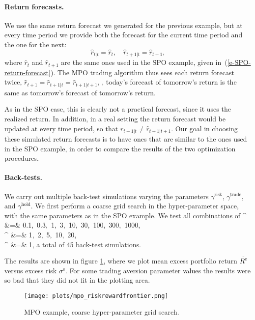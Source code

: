 \documentclass[openany]{now}
\newcommand{\Rep}{R^\mathrm{e}}
\begin{document}
\paragraph{Return forecasts.}
We use the same return forecast we generated for the previous example,
but at every time period we provide both the forecast for the current time period
and the one for the next:
\[
\hat r_{t|t} =  \hat r_t, \quad
\hat r_{t+1|t} =  \hat r_{t+1},
\]
where $\hat r_t$ and $\hat r_{t+1}$ are the same ones used in the
SPO example, given in~(\ref{e-SPO-return-forecast}).
The MPO trading algorithm thus sees each return forecast twice,
$\hat r_{t+1} = \hat r_{t+1|t} = \hat r_{t+1|t+1}$,
\ie, today's forecast of tomorrow's return is the same as tomorrow's forecast
of tomorrow's return.

As in the SPO case, this is clearly not a practical forecast, since it uses
the realized return.
In addition, in a real setting the return forecast would be updated at
every time period,
so that $\hat r_{t+1|t} \neq \hat r_{t+1|t+1}$.
Our goal in choosing these simulated return forecasts is to have ones that are
similar to the ones used in the SPO example, in order to compare the
results of the two optimization procedures.

\paragraph{Back-tests.}
We carry out multiple back-test simulations varying the parameters
$\gamma^\text{risk}$, $\gamma^\text{trade}$, and $\gamma^\text{hold}$.
We first perform a coarse grid search in the hyper-parameter space,
with the same parameters as in the SPO example.
We test all combinations of
\BEAS
\gamma^ &=& 0.1,~0.3,~1,~3,~10,~30,~100,~300,~1000,\\
\gamma^ &=& 1,~2,~5,~10,~20,\\
\gamma^ &=& 1,
\EEAS
a total of 45 back-test simulations.

The results are shown in figure \ref{fig:mpo-frontier},
where we plot mean excess portfolio return $\overline{\Rep}$
versus excess risk $\sigma^\mathrm{e}$.
For some trading aversion parameter values
the results were so bad that they did not fit in the plotting area.
\begin{figure}
\begin{center}
\texttt{[image: plots/mpo\_riskrewardfrontier.png]}
\end{center}
\caption{MPO example, coarse hyper-parameter grid search.}
\label{fig:mpo-frontier}
\end{figure}
\end{document}
